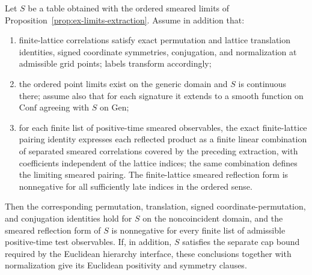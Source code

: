 \begin{proposition}
\label{prop:ex-limits-euclidean}
Let $S$ be a table obtained with the ordered smeared limits of
Proposition~\ref{prop:ex-limits-extraction}. Assume in addition that:

\begin{enumerate}
\item finite-lattice correlations satisfy exact permutation and lattice
  translation identities, signed coordinate symmetries, conjugation, and
  normalization at admissible grid points; labels transform accordingly;
\item the ordered point limits exist on the generic domain and $S$ is
  continuous there; assume also that for each signature it extends to a smooth
  function on $\mathrm{Conf}$ agreeing with $S$ on $\mathrm{Gen}$;
\item for each finite list of positive-time smeared observables, the exact
  finite-lattice pairing identity expresses each reflected product as a finite
  linear combination of separated smeared correlations covered by the
  preceding extraction, with coefficients independent of the lattice indices;
  the same combination defines the limiting smeared pairing. The finite-lattice
  smeared reflection form is nonnegative for all sufficiently late indices in
  the ordered sense.
\end{enumerate}

Then the corresponding permutation, translation, signed coordinate-permutation,
and conjugation identities hold for $S$ on the noncoincident domain, and the
smeared reflection form of $S$ is nonnegative for every finite list of
admissible positive-time test observables. If, in addition, $S$ satisfies the separate cap bound required by the
Euclidean hierarchy interface, these conclusions together with normalization
give its Euclidean positivity and symmetry clauses.
\end{proposition}

